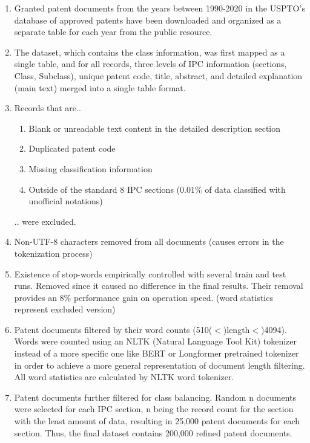 \documentclass{iyte}
\begin{document}
\begin{enumerate}
   \item Granted patent documents from the years between 1990-2020 in the USPTO's database of approved patents have been downloaded and organized as a separate table for each year from the public resource.
   \item The dataset, which contains the class information, was first mapped as a single table, and for all records, three levels of IPC information (sections, Class, Subclass), unique patent code, title, abstract, and detailed explanation (main text) merged into a single table format.
   \item Records that are..
       \begin{enumerate}
           \item Blank or unreadable text content in the detailed description section
           \item Duplicated patent code
           \item Missing classification information
           \item Outside of the standard 8 IPC sections (0.01\% of data classified with unofficial notations)
      \end{enumerate}
        .. were excluded.
   \item Non-UTF-8 characters removed from all documents (causes errors in the tokenization process)
   \item Existence of stop-words empirically controlled with several train and test runs. Removed since it caused no difference in the final results. Their removal provides an 8\% performance gain on operation speed. (word statistics represent excluded version)
   \item Patent documents filtered by their word counts (510($<$)length$<$)4094). Words were counted using an NLTK (Natural Language Tool Kit) tokenizer instead of a more specific one like BERT or Longformer pretrained tokenizer in order to achieve a more general representation of document length filtering. All word statistics are calculated by NLTK word tokenizer.
   \item Patent documents further filtered for class balancing. Random n documents were selected for each IPC section, n being the record count for the section with the least amount of data, resulting in 25,000 patent documents for each section. Thus, the final dataset contains 200,000 refined patent documents.
 \end{enumerate}
\end{document}
